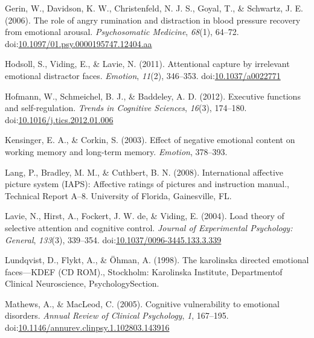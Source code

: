 \documentclass[man]{apa6}
\begin{document}
\leavevmode\hypertarget{ref-gerin_role_2006}{}%
Gerin, W., Davidson, K. W., Christenfeld, N. J. S., Goyal, T., \& Schwartz, J. E. (2006). The role of angry rumination and distraction in blood pressure recovery from emotional arousal. \emph{Psychosomatic Medicine}, \emph{68}(1), 64--72. doi:\href{https://doi.org/10.1097/01.psy.0000195747.12404.aa}{10.1097/01.psy.0000195747.12404.aa}

\leavevmode\hypertarget{ref-hodsoll_attentional_2011}{}%
Hodsoll, S., Viding, E., \& Lavie, N. (2011). Attentional capture by irrelevant emotional distractor faces. \emph{Emotion}, \emph{11}(2), 346--353. doi:\href{https://doi.org/10.1037/a0022771}{10.1037/a0022771}

\leavevmode\hypertarget{ref-hofmann_executive_2012}{}%
Hofmann, W., Schmeichel, B. J., \& Baddeley, A. D. (2012). Executive functions and self-regulation. \emph{Trends in Cognitive Sciences}, \emph{16}(3), 174--180. doi:\href{https://doi.org/10.1016/j.tics.2012.01.006}{10.1016/j.tics.2012.01.006}

\leavevmode\hypertarget{ref-kensinger_effect_2003}{}%
Kensinger, E. A., \& Corkin, S. (2003). Effect of negative emotional content on working memory and long-term memory. \emph{Emotion}, 378--393.

\leavevmode\hypertarget{ref-lang_international_2008}{}%
Lang, P., Bradley, M. M., \& Cuthbert, B. N. (2008). International affective picture system (IAPS): Affective ratings of pictures and instruction manual., Technical Report A--8. University of Florida, Gainesville, FL.

\leavevmode\hypertarget{ref-lavie_load_2004}{}%
Lavie, N., Hirst, A., Fockert, J. W. de, \& Viding, E. (2004). Load theory of selective attention and cognitive control. \emph{Journal of Experimental Psychology: General}, \emph{133}(3), 339--354. doi:\href{https://doi.org/10.1037/0096-3445.133.3.339}{10.1037/0096-3445.133.3.339}

\leavevmode\hypertarget{ref-lundqvist_karolinska_1998}{}%
Lundqvist, D., Flykt, A., \& Öhman, A. (1998). The karolinska directed emotional faces---KDEF (CD ROM)., Stockholm: Karolinska Institute, Departmentof Clinical Neuroscience, PsychologySection.

\leavevmode\hypertarget{ref-mathews_cognitive_2005}{}%
Mathews, A., \& MacLeod, C. (2005). Cognitive vulnerability to emotional disorders. \emph{Annual Review of Clinical Psychology}, \emph{1}, 167--195. doi:\href{https://doi.org/10.1146/annurev.clinpsy.1.102803.143916}{10.1146/annurev.clinpsy.1.102803.143916}
\end{document}
